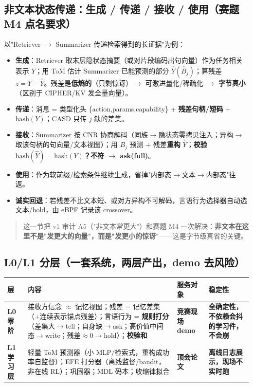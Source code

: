 \documentclass[UTF8,fontset=windows,11pt]{ctexart}
\newcommand{\key}[1]{\textbf{\textcolor{NavyBlue}{#1}}}
\begin{document}
\subsection{非文本状态传递：生成 / 传递 / 接收 / 使用（赛题 M4 点名要求）}
以"Retriever $\to$ Summarizer 传递检索得到的长证据"为例：
\begin{itemize}
\item \key{生成}：Retriever 取末层隐状态摘要（或对片段编码出句向量）作为任务相关表示 $Y$；用 ToM 估计 Summarizer 已能预测的部分 $\hat Y(\hat B_j)$；算残差 $z=Y-\hat Y$。残差是\textbf{低熵的}（只剩惊讶）$\to$ 可激进量化/稀疏化 $\to$ \textbf{字节真小}（区别于 CIPHER/KV 发全量向量）。
\item \key{传递}：消息 = 类型化头 \{action,params,capability\} + \textbf{残差句柄/短码} + $\mathrm{hash}(Y)$；CASD 只传 $j$ 缺的差集。
\item \key{接收}：Summarizer 按 CNR 协商解码（同族$\to$隐状态零拷贝注入；异构$\to$取该句柄的句向量/文本视图）；用 $B_j$ 预测 + 残差\textbf{重构} $\hat Y$；\textbf{校验 $\mathrm{hash}(\hat Y)=\mathrm{hash}(Y)$？不符 $\to$ ask(full)}。
\item \key{使用}：作为软前缀/检索条件继续生成，省掉"内部态$\to$文本$\to$内部态"往返。
\item \key{诚实回退}：若残差不比文本短、或对方异构不可解码，言语行为选择器自动选文本/hold，由 eBPF 记录该 crossover。
\end{itemize}
\begin{quote}\small
这一节把 v1 审计 A5（"非文本常更大"）和赛题 M4 一次解决：\textbf{非文本在这里不是"发更大的向量"，而是"发更小的惊讶"}——这是字节级真省的关键。
\end{quote}

\subsection{L0/L1 分层（一套系统，两层产出，demo 去风险）}
\begin{table}[h]\small\centering
\renewcommand{\arraystretch}{1.25}
\begin{tabularx}{\linewidth}{@{}p{1.5cm}Y p{2.0cm}p{3.0cm}@{}}
\toprule
\textbf{层} & \textbf{内容} & \textbf{服务对象} & \textbf{稳定性} \\
\midrule
\textbf{L0 零阶} & 接收方信念 $\approx$ 记忆视图；残差 = 记忆差集（+连续表示锚点残差）；言语行为 = \textbf{规则打分}（差集大$\to$tell；自身缺$\to$ask；高价值中间态$\to$write；残差$\approx0\to$hold）；\textbf{校验和} & \textbf{竞赛现场 demo} & \textbf{全确定性，不依赖会抖的学习件，不会崩} \\
\textbf{L1 学习层} & 轻量 ToM 预测器（小 MLP/检索式，重构成功率自监督）；EFE 打分器（离线监督/bandit，非在线 RL）；巩固器；MDL 码本；收缩律拟合 & \textbf{顶会论文} & \textbf{离线日志展示，现场不实时跑} \\
\bottomrule
\end{tabularx}
\end{table}
\end{document}
